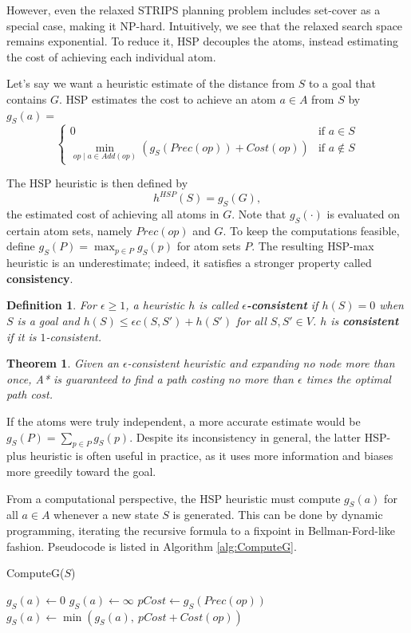 \documentclass[letterpaper]{article}
\newtheorem{thm}{Theorem}
\newtheorem{defn}{Definition}
\begin{document}
However, even the relaxed STRIPS planning problem includes set-cover as a special case, making it NP-hard.
Intuitively, we see that the relaxed search space remains exponential.
To reduce it, HSP decouples the atoms, instead estimating the cost of achieving each individual atom.

Let's say we want a heuristic estimate of the distance from $S$ to a goal that contains $G$. HSP estimates the cost to achieve an atom $a\in A$ from $S$ by $g_S(a) = $
\[\begin{cases} 0  &\mbox{if } a \in S
\\ \min_{op\mid a\in Add(op)} \left(g_S(Prec(op)) + Cost(op)\right)  &\mbox{if } a \notin S \end{cases}\]

The HSP heuristic is then defined by
\[h^{HSP}(S) = g_S(G),\]
the estimated cost of achieving all atoms in $G$. Note that $g_S(\cdot)$ is evaluated on certain atom sets, namely $Prec(op)$ and $G$.
To keep the computations feasible, define $g_S(P) = \max_{p\in P} g_S(p)$ for atom sets $P$.
The resulting HSP-max heuristic is an underestimate; indeed, it satisfies a stronger property called \textbf{consistency}.

\begin{defn} For $\epsilon\ge 1$, a heuristic $h$ is called \textbf{$\epsilon$-consistent} if $h(S) = 0$ when $S$ is a goal and $h(S) \le \epsilon c(S,S') + h(S')$ for all $S,S'\in V$. $h$ is \textbf{consistent} if it is $1$-consistent. \end{defn}
\begin{thm} Given an $\epsilon$-consistent heuristic and expanding no node more than once, A* is guaranteed to find a path costing no more than $\epsilon$ times the optimal path cost.  \end{thm}

If the atoms were truly independent, a more accurate estimate would be $g_S(P) = \sum_{p\in P} g_S(p)$.
Despite its inconsistency in general, the latter HSP-plus heuristic is often useful in practice, as it uses more information and biases more greedily toward the goal.

From a computational perspective, the HSP heuristic must compute $g_S(a)$ for all $a\in A$ whenever a new state $S$ is generated.
This can be done by dynamic programming, iterating the recursive formula to a fixpoint in Bellman-Ford-like fashion.
Pseudocode is listed in Algorithm \ref{alg:ComputeG}.

\begin{algorithm}
\caption{ComputeG($S$)}
\label{alg:ComputeG}
\begin{algorithmic}
\STATE $g_S(a) \leftarrow 0$
\ELSE
\STATE $g_S(a) \leftarrow \infty$
\ENDIF
\ENDFOR
\REPEAT
{}
\STATE $pCost \leftarrow g_S(Prec(op))$
\STATE $g_S(a) \leftarrow \min \left(g_S(a),~pCost + Cost(op)\right)$
\ENDFOR
\ENDFOR
{}
\end{algorithmic}
\end{algorithm}
\end{document}
